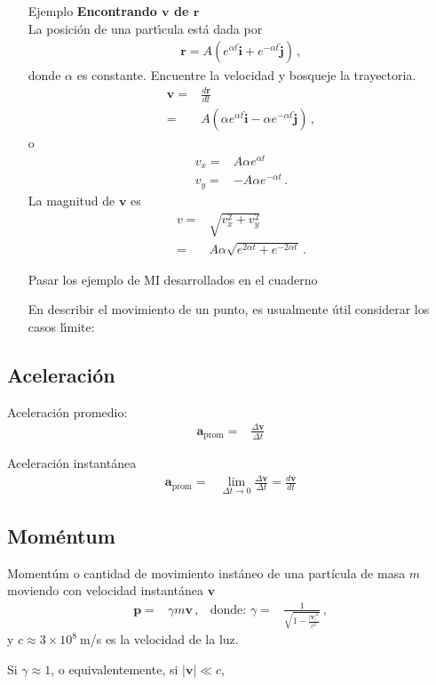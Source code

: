 \begin{itemize}
\item[Ejemplo] \textbf{Encontrando $\mathbf{v}$ de $\mathbf{r}$}\\
La posici\'on de una part\'\i cula est\'a dada por
\begin{align}
  \mathbf{r}=A(e^{\alpha t}\hat{\mathbf{i}}+e^{-\alpha t}\hat{\mathbf{j}})\,,
\end{align}
donde $\alpha$ es constante. Encuentre la velocidad y bosqueje la trayectoria.
\begin{align}
    \mathbf{v}=&\frac{d\mathbf{r}}{dt}\nonumber\\
    =&A(\alpha e^{\alpha t}\hat{\mathbf{i}}-\alpha e^{-\alpha t}\hat{\mathbf{j}})\,,
\end{align}
o
\begin{align}
  v_x=&A\alpha e^{\alpha t}\nonumber\\
  v_y=&-A\alpha e^{-\alpha t}\,.
\end{align}
La magnitud de $\mathbf{v}$ es
\begin{align}
  v=&\sqrt{v_x^2+v_y^2}\nonumber\\
  =&A\alpha\sqrt{e^{2\alpha t}+e^{-2\alpha t}}\,.
\end{align}

\begin{inprogress}
  Pasar los ejemplo de MI desarrollados en el cuaderno
\end{inprogress}
En describir el movimiento de un punto, es usualmente \'util considerar los casos l\'\i mite:
\end{itemize}

\subsection{Aceleración}

Aceleración promedio:
\begin{align}
  \mathbf{a}_{\text{prom}}=&\frac{\Delta \mathbf{v}}{\Delta t}
\end{align}

Aceleración instantánea
\begin{align}
  \mathbf{a}_{\text{prom}}=&\lim_{\Delta t\to 0}\frac{\Delta \mathbf{v}}{\Delta t}=\frac{d\mathbf{v}}{dt}
\end{align}

\subsection{Moméntum}

Momentúm o cantidad de movimiento instáneo de una partícula de masa $m$ moviendo con velocidad instantánea $\mathbf{v}$
\begin{align}
  \mathbf{p}=&\gamma m \mathbf{v}\,, &\text{donde: } \gamma=&\frac{1}{\sqrt{1-\frac{|\mathbf{v}|^2}{c^2}}}\,,
\end{align}
y $c\approx 3\times 10^8\ $m/s es la velocidad de la luz.

Si $\gamma\approx1$, o equivalentemente, si $|\mathbf{v}|\ll c$, 


